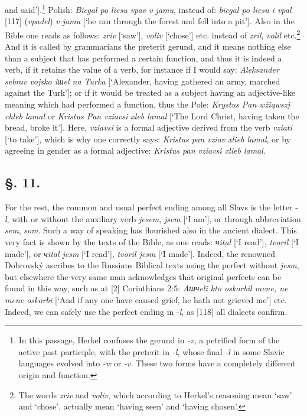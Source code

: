 and said’].\footnote{In this passage, Herkel confuses the gerund in \textit{-v}, a petrified form of the active past participle, with the preterit in \textit{-l}, whose final \textit{-l} in some Slavic languages evolved into \textit{-w} or \textit{-v}. These two forms have a completely different origin and function.} Polish: \textit{Biegal po liesu vpav v jamu}, instead of: \textit{biegal po liesu i vpal} [117] (\textit{vpadel}) \textit{v jamu} [‘he ran through the forest and fell into a pit’]. Also in the Bible one reads as follows: \textit{zriv} [‘saw’], \textit{voliv} [‘chose’] etc. instead of \textit{zril}, \textit{volil} etc.\footnote{The words \textit{zriv} and \textit{voliv}, which according to Herkel’s reasoning mean ‘saw’ and ‘chose’, actually mean ‘having seen’ and ‘having chosen’.} And it is called by grammarians the preterit gerund, and it means nothing else than a subject that has performed a certain function, and thus it is indeed a verb, if it retains the value of a verb, for instance if I would say: \textit{Aleksander sebrav vojsko iшel na Turka} [‘Alexander, having gathered an army, marched against the Turk’]; or if it would be treated as a subject having an adjective-like meaning which had performed a function, thus the Pole: \textit{Krystus Pan wźiąwszj chleb lamal} or \textit{Kristus Pan vziavsi xleb lamal} [‘The Lord Christ, having taken the bread, broke it’]. Here, \textit{vziavsi} is a formal adjective derived from the verb \textit{vziati} [‘to take’], which is why one correctly says: \textit{Kristus pan vziav xlieb lamal}, or by agreeing in gender as a formal adjective: \textit{Kristus pan vziavsi xlieb lamal}.

\subsection*{\hspace*{\fill}§. 11.\hspace*{\fill}}

For the rest, the common and usual perfect ending among all Slavs is the letter -\textit{l}, with or without the auxiliary verb \textit{jesem}, \textit{jsem} [‘I am’], or through abbreviation \textit{sem}, \textit{som}. Such a way of speaking has flourished also in the ancient dialect. This very fact is shown by the texts of the Bible, as one reads: \textit{чital} [‘I read’], \textit{tvoril} [‘I made’], or \textit{чital jesm} [‘I read’], \textit{tvoril jesm} [‘I made’]. Indeed, the renowned Dobrovský ascribes to the Russians Biblical texts using the perfect without \textit{jesm}, but elsewhere the very same man acknowledges that original perfects can be found in this way, such as at [2] Corinthians 2:5: \textit{Aшчeli kto oskorbil mene, ne mene oskorbi} [‘And if any one have caused grief, he hath not grieved me’] etc. Indeed, we can safely use the perfect ending in -\textit{l}, as [118] all dialects confirm.

